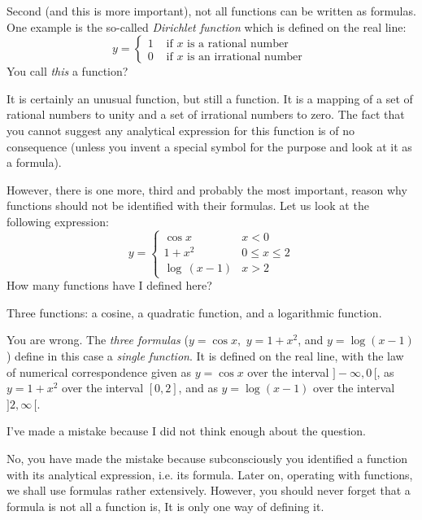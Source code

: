 {Second (and this is more important), not all functions can be written as formulas. One example is the so-called \emph{Dirichlet function} which is defined on the real line:
\begin{equation*}%
y = 
\begin{cases}
 1 & \text{ if $x$ is a rational number} \\
 0 & \text{ if $x$ is an irrational number }
\end{cases}
\end{equation*}
\rdr You call \emph{this} a function?

\athr It is certainly an unusual function, but still a function. It is a mapping of a set of rational numbers to unity and a set of irrational numbers to zero. The fact that you cannot suggest any analytical expression for this function is of no consequence (unless you invent a special symbol for the purpose and look at it as a formula).

However, there is one more, third and probably the most important, reason why functions should not be identified with their formulas. Let us look at the following expression:
\begin{equation*}%
y = 
\begin{cases}
\cos x &  x < 0 \\
1 + x^{2} & 0 \leqslant x \leqslant 2 \\
\log \, (x - 1) & x > 2 
\end{cases}
\end{equation*}
How many functions have I defined here? 

\rdr Three functions: a cosine, a quadratic function, and a logarithmic function. 

\athr You are wrong. The \emph{three formulas} ($y = \cos x, \,\,
y = 1 + x^{2}$, and $y=\log (x- 1)$) define in this case a \emph{single function}. It is defined on the real line, with the law of numerical correspondence given as $y = \cos x$ over the interval $]-\infty, 0 \, [$, as $y = 1 + x^{2}$ over the interval $[0,2]$, and as $y = \log (x - 1)$ over the interval $]2, \infty \,[$.

\rdr I've made a mistake because I did not think enough about the question.

\athr	No, you have made the mistake because subconsciously you identified a function with its analytical expression, i.e. its formula. Later on, operating with functions, we shall use formulas rather extensively. However, you should never forget that a formula is not all a function is, It is only one way of defining it.

}
